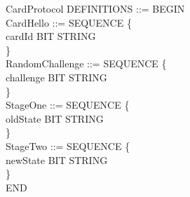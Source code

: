 \documentclass[10pt,titlepage]{article}
\begin{document}
CardProtocol DEFINITIONS ::= BEGIN \\

\noindent
CardHello ::= SEQUENCE \{\\
\indent cardId       BIT STRING\\
\}\\

\noindent
RandomChallenge ::= SEQUENCE \{\\
\indent challenge    BIT STRING\\
\}\\

\noindent
StageOne ::= SEQUENCE \{\\
\indent oldState     BIT STRING\\
\}\\

\noindent
StageTwo ::= SEQUENCE \{\\
\indent newState     BIT STRING\\
\}\\

\noindent
END
\end{document}
